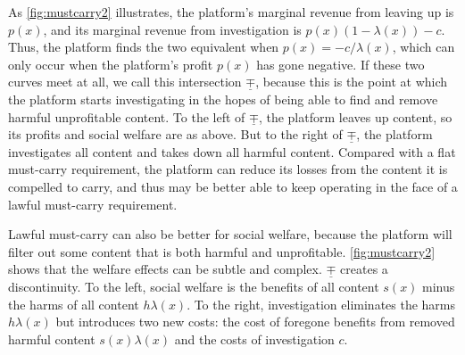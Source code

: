 As \autoref{fig:mustcarry2} illustrates, the platform's marginal revenue from leaving up is $p(x)$, and its marginal revenue from investigation is $p(x)(1 - \lambda(x)) -c $. Thus, the platform finds the two equivalent when $p(x) = {-c}/{\lambda(x)}$, which can only occur when the platform's profit $p(x)$ has gone negative. If these two curves meet at all, we call this intersection $\underline{\mp}$, because this is the point at which the platform starts investigating in the hopes of being able to find and remove harmful unprofitable content. To the left of $\underline{\mp}$, the platform leaves up content, so its profits and social welfare are as above. But to the right of $\underline{\mp}$, the platform investigates all content and takes down all harmful content. Compared with a flat must-carry requirement, the platform can reduce its losses from the content it is compelled to carry, and thus may be better able to keep operating in the face of a lawful must-carry requirement.

Lawful must-carry can also be better for social welfare, because the platform will filter out some content that is both harmful and unprofitable. \autoref{fig:mustcarry2} shows that the welfare effects can be subtle and complex. $\underline{\mp}$ creates a discontinuity. To the left, social welfare is the benefits of all content $s(x)$ minus the harms of all content $h\lambda(x)$. To the right, investigation eliminates the harms $h\lambda(x)$ but introduces two new costs: the cost of foregone benefits from removed harmful content $s(x)\lambda(x)$ and the costs of investigation $c$. 

